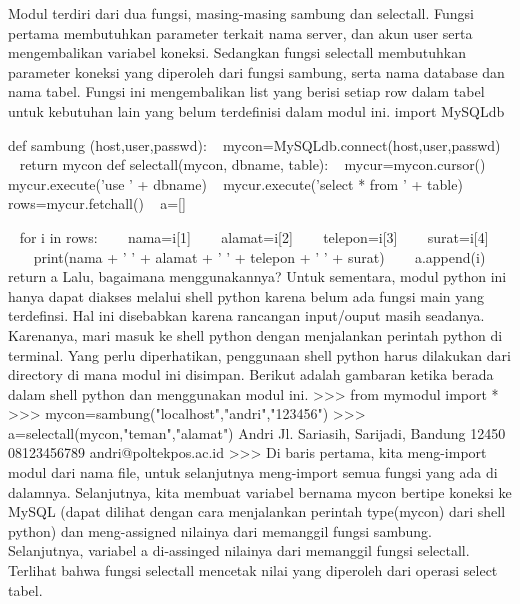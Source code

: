 \vspace{12pt}
Modul terdiri dari dua fungsi, masing-masing sambung dan selectall. Fungsi pertama membutuhkan parameter terkait nama server, dan akun user serta mengembalikan variabel koneksi. Sedangkan fungsi selectall membutuhkan parameter koneksi yang diperoleh dari fungsi sambung, serta nama database dan nama tabel. Fungsi ini mengembalikan list yang berisi setiap row dalam tabel untuk kebutuhan lain yang belum terdefinisi dalam modul ini. 
\vspace{12pt}
\noindent 
import MySQLdb \par
\noindent 
def sambung (host,user,passwd):
\noindent 
~ mycon=MySQLdb.connect(host,user,passwd) 
\noindent 
~ return mycon 
\vspace{12pt}
\noindent 
def selectall(mycon, dbname, table): 
\noindent 
~ mycur=mycon.cursor() 
\noindent 
~ mycur.execute('use ' + dbname) 
\noindent 
~ mycur.execute('select * from ' + table) 
\noindent 
~ rows=mycur.fetchall() 
\noindent 
~ a=[] \par
\noindent 
~ for i in rows: 
\noindent 
~~~ nama=i[1] 
\noindent 
~~~ alamat=i[2] 
\noindent 
~~~ telepon=i[3]
\noindent 
~~~ surat=i[4] 
\noindent 
~~~ print(nama + ' ' + alamat + ' ' + telepon + ' ' + surat)
\noindent 
~~~ a.append(i) 
\noindent 
~ return a 
Lalu, bagaimana menggunakannya? Untuk sementara, modul python ini hanya dapat diakses melalui shell python karena belum ada fungsi main yang terdefinsi. Hal ini disebabkan karena rancangan input/ouput masih seadanya. Karenanya, mari masuk ke shell python dengan menjalankan perintah python di terminal. Yang perlu diperhatikan, penggunaan shell python harus dilakukan dari directory di mana modul ini disimpan. Berikut adalah gambaran ketika berada dalam shell python dan menggunakan modul ini. 
\noindent 
>>> from mymodul import * 
\noindent 
>>> mycon=sambung("localhost","andri","123456") 
\noindent 
>>> a=selectall(mycon,"teman","alamat") 
\noindent 
Andri Jl. Sariasih, Sarijadi, Bandung 12450 08123456789 andri@poltekpos.ac.id 
\noindent 
>>>
Di baris pertama, kita meng-import modul dari nama file, untuk selanjutnya meng-import semua fungsi yang ada di dalamnya. Selanjutnya, kita membuat variabel bernama mycon bertipe koneksi ke MySQL (dapat dilihat dengan cara menjalankan perintah type(mycon) dari shell python) dan meng-assigned nilainya dari memanggil fungsi sambung. Selanjutnya, variabel a di-assinged nilainya dari memanggil fungsi selectall. Terlihat bahwa fungsi selectall mencetak nilai yang diperoleh dari operasi select tabel. 
\vspace{12pt}

